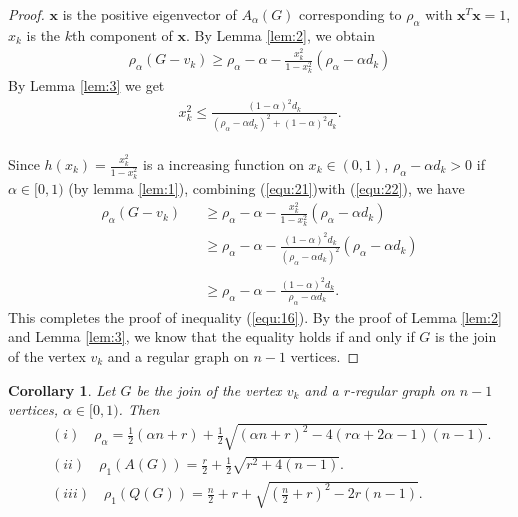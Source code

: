 \documentclass[amsthm]{elsart}
\newtheorem{corollary}{Corollary}[section]
\begin{document}
\begin{proof}
$\textbf{x}$ is the positive eigenvector of $A_\alpha (G)$ corresponding to $\rho _\alpha$  with $\textbf{x}^T \textbf{x} = 1$, $x_k$ is the $k$th component of $\textbf{x}$.
By Lemma \ref {lem:2}, we obtain \\
\begin{eqnarray} \label{equ:21}
\rho _\alpha (G - v_k)
    \geqslant \rho _\alpha - \alpha - \frac{x_k^2}{1 - x_k^2} (\rho _\alpha - \alpha d_k)
\end{eqnarray}
By Lemma \ref {lem:3} we get
\begin{eqnarray} \label{equ:22}
x_k^2 \leqslant \frac{(1 - \alpha)^2 d_k}{(\rho _\alpha - \alpha d_k)^2 + (1 - \alpha)^2 d_k}.
\end{eqnarray}
\\
Since $h(x_k) = \frac{x_k^2}{1 - x_k^2} $ is a increasing function on $x_k \in (0, 1)$, $\rho _\alpha - \alpha d_k > 0$ if $\alpha \in [0, 1)$ (by lemma \ref{lem:1}), combining (\ref{equ:21})with (\ref{equ:22}), we have  \\
\begin{eqnarray*}
\rho _\alpha (G - v_k)
  &&\geqslant \rho _\alpha - \alpha - \frac{x_k^2}{1 - x_k^2} (\rho _\alpha - \alpha d_k)
  \\ &&\geqslant \rho _\alpha - \alpha - \frac{(1 - \alpha)^2 d_k}{(\rho _\alpha - \alpha d_k)^2} (\rho _\alpha - \alpha d_k)  \\
  \\ &&\geqslant \rho _\alpha - \alpha - \frac{(1 - \alpha)^2 d_k}{\rho _\alpha - \alpha d_k}
.
\end{eqnarray*}
This completes the proof of inequality (\ref{equ:16}).
By the proof of Lemma \ref {lem:2} and Lemma \ref {lem:3}, we know that the equality holds if and only if $G$ is the join of the vertex $v_k$ and a regular graph on $n-1$ vertices.
\end{proof}

\begin{corollary} \label{coro:1}
Let $G$ be the join of the vertex $v_k$ and a $r$-regular graph on $n-1$ vertices, $\alpha \in [0, 1)$.  Then
\begin{eqnarray*}
&&(i) \quad \rho _\alpha = \frac{1}{2}(\alpha n + r) + \frac{1}{2} \sqrt{(\alpha n + r)^2 - 4 (r \alpha + 2 \alpha - 1) ( n - 1) }.
\\ &&(ii) \quad \rho _1(A(G)) = \frac{r}{2} + \frac{1}{2} \sqrt{r ^2 + 4 ( n - 1) }.
\\ &&(iii) \quad \rho _1(Q(G)) = \frac{n}{2} + r +  \sqrt{(\frac{n}{2} + r)^2 - 2 r ( n - 1) }.
\end{eqnarray*}
\end{corollary}
\end{document}
